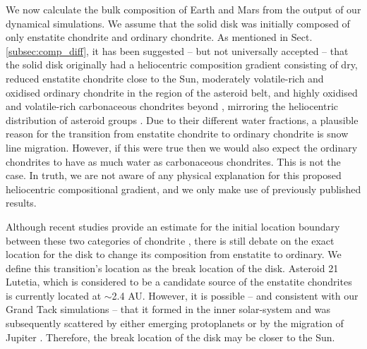 \documentclass{aa}
\begin{document}
We now calculate the bulk composition of Earth and Mars from the output of our dynamical simulations. We assume that the solid disk was initially composed of only enstatite chondrite and ordinary chondrite. 
As mentioned in Sect. \ref{subsec:comp_diff}, it has been suggested -- but not universally accepted -- that the solid disk originally had a heliocentric composition gradient consisting of dry, reduced enstatite chondrite close to the Sun, moderately volatile-rich and oxidised ordinary chondrite in the region of the asteroid belt, and highly oxidised and volatile-rich carbonaceous chondrites beyond \citep{morbidelli2012building,rubie2015accretion,fischer2017ruthenium}, mirroring the heliocentric distribution of asteroid groups \citep{gradie1982compositional,demeo2014solar}. Due to their different water fractions, a plausible reason for the transition from enstatite chondrite to ordinary chondrite is snow line migration. However, if this were true then we would also expect the ordinary chondrites to have as much water as carbonaceous chondrites. This is not the case. In truth, we are not aware of any physical explanation for this proposed heliocentric compositional gradient, and we only make use of previously published results. 

Although recent studies provide an estimate for the initial location boundary between these two categories of chondrite \citep{morbidelli2012building,fischer2017ruthenium,o2018delivery}, there is still debate on the exact location for the disk to change its composition from enstatite to ordinary. We define this transition's location as the break location of the disk. Asteroid 21 Lutetia, which is considered to be a candidate source of the enstatite chondrites \citep{vernazza2009plausible,coradini2011surface} is currently located at $\sim$2.4 AU. However, it is possible -- and consistent with our Grand Tack simulations -- that it formed in the inner solar-system and was subsequently scattered by either emerging protoplanets or by the migration of Jupiter \citep{vernazza2011asteroid}. Therefore, the break location of the disk may be closer to the Sun.
\end{document}
